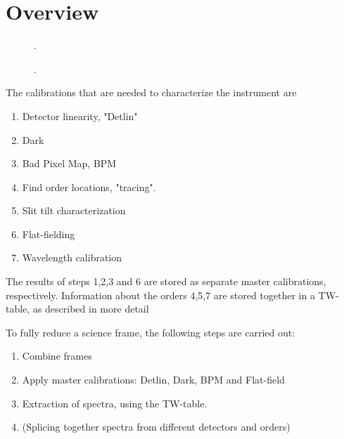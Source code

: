 \section{Overview}
\label{sec:overview}


\begin{figure}[!tb]
  \begin{center}
  \end{center}
  \caption{
    \label{fig:calibflow_detailed}
    .}
\end{figure}

\begin{figure}[!tb]
  \begin{center}
  \end{center}
  \caption{
    \label{fig:calibflow_simple}
    .}
\end{figure}



The calibrations that are needed to characterize the instrument are
\begin{enumerate}
    \item Detector linearity, "Detlin"
    \item Dark
    \item Bad Pixel Map, BPM
    \item Find order locations, "tracing".
    \item Slit tilt characterization
    \item Flat-fielding
    \item Wavelength calibration
\end{enumerate} 

The results of steps 1,2,3 and 6 are stored as separate master calibrations, respectively. Information about the orders 4,5,7 are stored together in a TW-table, as described in more detail %

To fully reduce a science frame, the following steps are carried out:
\begin{enumerate}
    \item Combine frames
    \item Apply master calibrations: Detlin, Dark, BPM and Flat-field
    \item Extraction of spectra, using the TW-table.
    \item (Splicing together spectra from different detectors and orders)
\end{enumerate}

